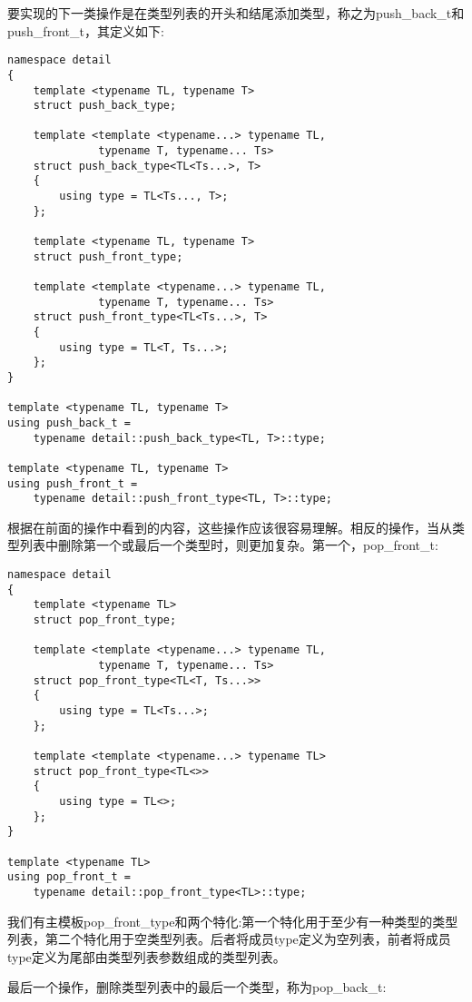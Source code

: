要实现的下一类操作是在类型列表的开头和结尾添加类型，称之为push\_back\_t和push\_front\_t，其定义如下:

\begin{lstlisting}[style=styleCXX]
namespace detail
{
	template <typename TL, typename T>
	struct push_back_type;
	
	template <template <typename...> typename TL,
			  typename T, typename... Ts>
	struct push_back_type<TL<Ts...>, T>
	{
		using type = TL<Ts..., T>;
	};

	template <typename TL, typename T>
	struct push_front_type;
	
	template <template <typename...> typename TL,
			  typename T, typename... Ts>
	struct push_front_type<TL<Ts...>, T>
	{
		using type = TL<T, Ts...>;
	};
}

template <typename TL, typename T>
using push_back_t =
	typename detail::push_back_type<TL, T>::type;
	
template <typename TL, typename T>
using push_front_t =
	typename detail::push_front_type<TL, T>::type;
\end{lstlisting}

根据在前面的操作中看到的内容，这些操作应该很容易理解。相反的操作，当从类型列表中删除第一个或最后一个类型时，则更加复杂。第一个，pop\_front\_t:

\begin{lstlisting}[style=styleCXX]
namespace detail
{
	template <typename TL>
	struct pop_front_type;
	
	template <template <typename...> typename TL,
	          typename T, typename... Ts>
	struct pop_front_type<TL<T, Ts...>>
	{
		using type = TL<Ts...>;
	};

	template <template <typename...> typename TL>
	struct pop_front_type<TL<>>
	{
		using type = TL<>;
	};
}

template <typename TL>
using pop_front_t =
	typename detail::pop_front_type<TL>::type;
\end{lstlisting}

我们有主模板pop\_front\_type和两个特化:第一个特化用于至少有一种类型的类型列表，第二个特化用于空类型列表。后者将成员type定义为空列表，前者将成员type定义为尾部由类型列表参数组成的类型列表。

最后一个操作，删除类型列表中的最后一个类型，称为pop\_back\_t:


